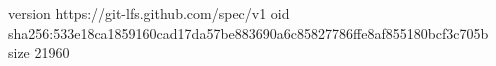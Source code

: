 version https://git-lfs.github.com/spec/v1
oid sha256:533e18ca1859160cad17da57be883690a6c85827786ffe8af855180bcf3c705b
size 21960
